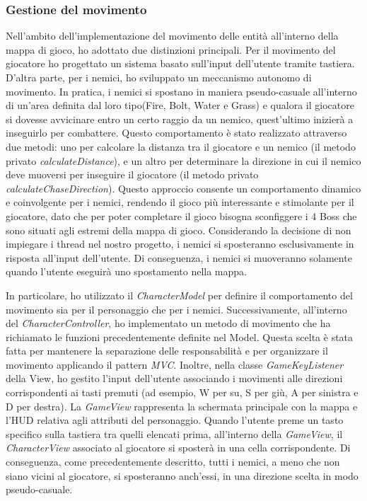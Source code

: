 \documentclass[a4paper,12pt]{report}
\begin{document}
\subsubsection{Gestione del movimento}
Nell'ambito dell'implementazione del movimento delle entità all'interno della mappa di gioco, ho adottato due distinzioni principali. Per il movimento del giocatore ho progettato un sistema basato sull'input dell'utente tramite tastiera. D'altra parte, per i nemici, ho sviluppato un meccanismo autonomo di movimento. In pratica, i nemici si spostano in maniera pseudo-casuale all'interno di un'area definita dal loro tipo(Fire, Bolt, Water e Grass) e qualora il giocatore si dovesse avvicinare entro un certo raggio da un nemico, quest'ultimo inizierà a inseguirlo per combattere. Questo comportamento è stato realizzato attraverso due metodi: uno per calcolare la distanza tra il giocatore e un nemico (il metodo privato \textit{calculateDistance}), e un altro per determinare la direzione in cui il nemico deve muoversi per inseguire il giocatore (il metodo privato \textit{calculateChaseDirection}). Questo approccio consente un comportamento dinamico e coinvolgente per i nemici, rendendo il gioco più interessante e stimolante per il giocatore, dato che per poter completare il gioco bisogna sconfiggere i 4 Boss che sono situati agli estremi della mappa di gioco.
Considerando la decisione di non impiegare i thread nel nostro progetto, i nemici si sposteranno esclusivamente in risposta all'input dell'utente. Di conseguenza, i nemici si muoveranno solamente quando l'utente eseguirà uno spostamento nella mappa.

In particolare, ho utilizzato il \textit{CharacterModel} per definire il comportamento del movimento sia per il personaggio che per i nemici. Successivamente, all'interno del \textit{CharacterController}, ho implementato un metodo di movimento che ha richiamato le funzioni precedentemente definite nel Model. Questa scelta è stata fatta per mantenere la separazione delle responsabilità e per organizzare il movimento applicando il pattern \textit{MVC}. Inoltre, nella classe \textit{GameKeyListener} della View, ho gestito l'input dell'utente associando i movimenti alle direzioni corrispondenti ai tasti premuti (ad esempio, W per su, S per giù, A per sinistra e D per 	destra). La \textit{GameView} rappresenta la schermata principale con la mappa e l'HUD relativa agli attributi del personaggio.
Quando l'utente preme un tasto specifico sulla tastiera tra quelli elencati prima, all'interno della \textit{GameView}, il \textit{CharacterView} associato al giocatore si sposterà in una cella corrispondente. Di conseguenza, come precedentemente descritto, tutti i nemici, a meno che non siano vicini al giocatore, si sposteranno anch'essi, in una direzione scelta in modo pseudo-casuale.
\end{document}
